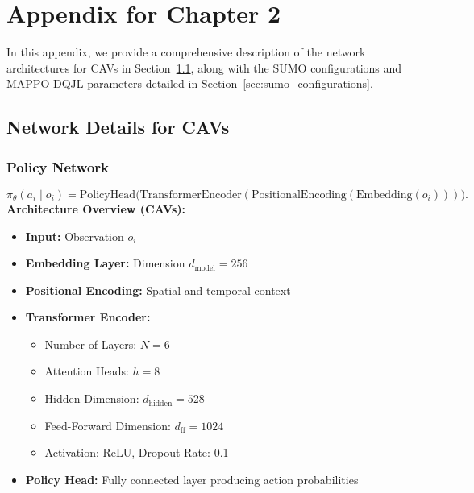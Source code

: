 \chapter{Appendix for Chapter 2}
In this appendix, we provide a comprehensive description of the network architectures for CAVs in Section~\ref{sec:network_design_for_CAVs}, along with the SUMO configurations and MAPPO-DQJL parameters detailed in Section~\ref{sec:sumo_configurations}.

\section{Network Details for CAVs}\label{sec:network_design_for_CAVs}
\subsection{Policy Network}\label{subsec:appendix_policy_network}
\[
\pi_{\theta}(a_i \mid o_i) = \text{PolicyHead}\bigl(\text{TransformerEncoder}(\text{PositionalEncoding}(\text{Embedding}(o_i)))\bigr).
\]
\noindent\textbf{Architecture Overview (CAVs):}
\begin{itemize}
    \item \textbf{Input:} Observation \(o_i\)
    \item \textbf{Embedding Layer:} Dimension \( d_{\text{model}} = 256 \)
    \item \textbf{Positional Encoding:} Spatial and temporal context
    \item \textbf{Transformer Encoder:} 
    \begin{itemize}
        \item Number of Layers: \( N = 6 \)
        \item Attention Heads: \( h = 8 \)
        \item Hidden Dimension: \( d_{\text{hidden}} = 528 \)
        \item Feed-Forward Dimension: \( d_{\text{ff}} = 1024 \)
        \item Activation: ReLU, Dropout Rate: 0.1
    \end{itemize}
    \item \textbf{Policy Head:} Fully connected layer producing action probabilities
\end{itemize}
  
